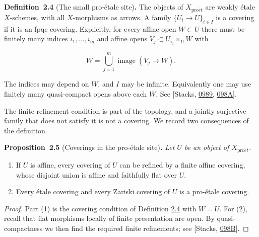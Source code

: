 \documentclass[11pt]{article}
\newenvironment{bpstatement}[2]{\par\addvspace{0.6\baselineskip}\noindent\textbf{#1}#2\textbf{.}\enspace\ignorespaces}
  {\par\addvspace{0.4\baselineskip}}
\newenvironment{bpstatementit}[2]{\begin{bpstatement}{#1}{#2}\itshape\ignorespaces}{\end{bpstatement}}
\begin{document}
\label{bp14}%
\begin{bpstatement}{Definition~2.4}{ (The small pro-étale site)}
The objects of \(X_{\mathrm{pro}\acute{e}t}\) are weakly étale \(X\)-schemes, with all \(X\)-morphisms as arrows. A family \(\{U_i\to U\}_{i\in I}\) is a covering if it is an fpqc covering. Explicitly, for every affine open \(W\subset U\) there must be finitely many indices \(i_1,\ldots,i_m\) and affine opens \(V_j\subset U_{i_j}\times_UW\) with

\[
W=\bigcup_{j=1}^m\operatorname{image}(V_j\to W).
\]

The indices may depend on \(W\), and \(I\) may be infinite. Equivalently one may use finitely many quasi-compact opens above each \(W\). See [Stacks, \href{https://stacks.math.columbia.edu/tag/0989}{0989}, \href{https://stacks.math.columbia.edu/tag/098A}{098A}].
\end{bpstatement}

\label{bp15}%
The finite refinement condition is part of the topology, and a jointly surjective family that does not satisfy it is not a covering. We record two consequences of the definition.

\label{bp16}%
\begin{bpstatementit}{Proposition~2.5}{ (Coverings in the pro-étale site)}
Let \(U\) be an object of \(X_{\mathrm{pro}\acute{e}t}\).

\begin{enumerate}
\item If \(U\) is affine, every covering of \(U\) can be refined by a finite affine covering, whose disjoint union is affine and faithfully flat over \(U\).
\item Every étale covering and every Zariski covering of \(U\) is a pro-étale covering.
\end{enumerate}
\end{bpstatementit}

\begin{proof}[{Proof}]\label{bp17}%
Part (1) is the covering condition of Definition \hyperref[bp14]{2.4} with \(W=U\). For (2), recall that flat morphisms locally of finite presentation are open. By quasi-compactness we then find the required finite refinements; see [Stacks, \href{https://stacks.math.columbia.edu/tag/098B}{098B}].
\end{proof}
\end{document}
